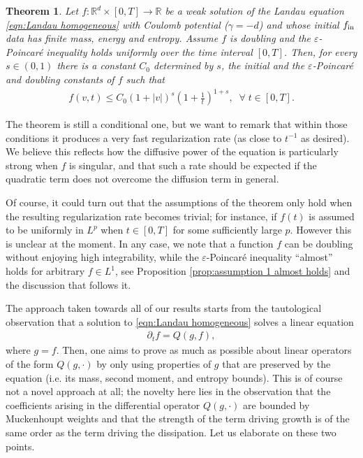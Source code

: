 \documentclass[12pt,american]{amsart}
\numberwithin{equation}{section}
\theoremstyle{plain}
\newtheorem{thm}{Theorem}[section]
\theoremstyle{definition}                  %
\def\fin{f_{\textnormal{in}}}
\begin{document}
\begin{thm}\label{thm:main Coulomb conditional}
  Let $f: \mathbb{R}^d\times [0,T] \to\mathbb{R}$ be a weak solution of the Landau equation \eqref{eqn:Landau homogeneous} with Coulomb potential ($\gamma=-d$) and whose initial $\fin$ data has finite mass, energy and entropy.  Assume $f$ is doubling and the $\varepsilon$-Poincar\'e inequality holds uniformly over the time interval $[0,T]$. Then, for every $s\in (0,1)$ there is a constant $C_0$ determined by $s$, the initial and the $\varepsilon$-Poincar\'e and doubling constants of $f$ such that
  \begin{align*}
    f(v,t) \leq C_0(1+|v|)^s\left ( 1 + \frac{1}{t} \right )^{1+s},\;\;\forall\;t\in [0,T].
  \end{align*}  
\end{thm}

The theorem is still a conditional one, but we want to remark that within those conditions it produces a very fast regularization rate (as close to $t^{-1}$ as desired). We believe this reflects how the diffusive power of the equation is particularly strong when $f$ is singular, and that such a rate should be expected if the quadratic term does not overcome the diffusion term in general.

Of course, it could turn out that the assumptions of the theorem only hold when the resulting regularization rate becomes trivial; for instance, if $f(t)$ is assumed to be uniformly in $L^p$ when $t\in [0,T]$ for some sufficiently large $p$. However this is unclear at the moment. In any case, we note that a function $f$ can be doubling without enjoying high integrability, while the $\varepsilon$-Poincar\'e inequality ``almost'' holds for arbitrary $f \in L^1$, see Proposition \ref{prop:assumption 1 almost holds} and the discussion that follows it.

The approach taken towards all of our results starts from the tautological observation that a solution to \eqref{eqn:Landau homogeneous} solves a linear equation
\begin{align}\label{eqn:linear equation}
  \partial_t f = Q(g,f),
\end{align}
where $g = f$. Then, one aims to prove as much as possible about linear operators of the form $Q(g,\cdot)$ by only using properties of $g$ that are preserved by the equation (i.e. its mass, second moment, and entropy bounds). This is of course not a novel approach at all; the novelty here lies in the observation that the coefficients arising in the differential operator $Q(g,\cdot)$ are bounded by Muckenhoupt weights and that the strength of the term driving growth is of the same order as the term driving the dissipation. Let us elaborate on these two points. 
\end{document}
